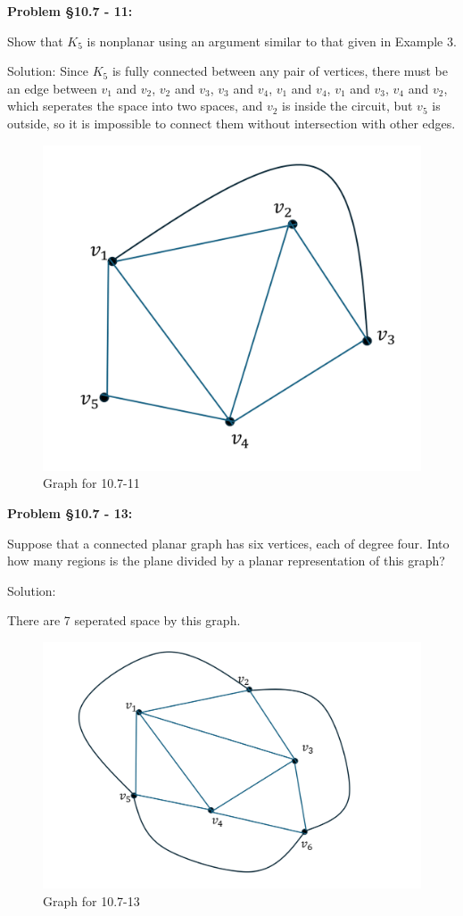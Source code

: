 \documentclass{article}
\newenvironment{problem}[1]
{\begin{mdframed}[default]
\textbf{Problem #1:}
}
{\end{mdframed}
}
\begin{document}
\begin{problem}{\S 10.7 - 11}
Show that $K_5$ is nonplanar using an argument similar to that given in Example 3.

Solution:
Since $K_5$ is fully connected between any pair of vertices, there must be an edge between $v_1$ and $v_2$, $v_2$ and $v_3$, $v_3$ and $v_4$, $v_1$ and $v_4$, $v_1$ and $v_3$, $v_4$ and $v_2$, which seperates the space into two spaces, and $v_2$ is inside the circuit, but $v_5$ is outside, so it is impossible to connect them without intersection with other edges.  

\end{problem}
\begin{figure}[h!]
    \centering
    \includegraphics[width=0.5\linewidth]{屏幕截图 2024-12-03 175057.png}
    \caption{Graph for 10.7-11}
    \label{fig:enter-label}
\end{figure}
\begin{problem}{\S 10.7 - 13}
Suppose that a connected planar graph has six vertices, each of degree four. Into
how many regions is the plane divided by a planar representation of this graph?

Solution:

There are 7 seperated space by this graph.
\end{problem}
\begin{figure}[h!]
    \centering
    \includegraphics[width=0.5\linewidth]{屏幕截图 2024-12-03 180426.png}
    \caption{Graph for 10.7-13}
    \label{fig:enter-label}
\end{figure}
\end{document}
